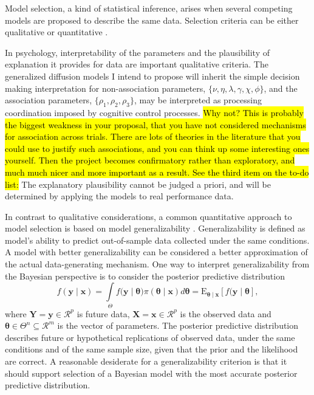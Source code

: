 \documentclass[12pt]{article}
\newcommand{\trish}[1]{\textrm{\hl{#1}}}
\begin{document}
Model selection, a kind of statistical inference, arises when several
competing models are proposed to describe the same data.
Selection criteria can be either qualitative or
quantitative \citep{MyuKar2008,ShiLee2008,VanMat2014}. 

In psychology, interpretability of the parameters and the
plausibility of explanation it provides for data are important
qualitative criteria. The generalized diffusion models I intend to
propose will inherit the simple decision making interpretation for
non-association parameters, $\{\nu, \eta, \lambda, \gamma, \chi, \phi\}$, and the association
parameters, $\{\rho_1, \rho_2, \rho_3\}$, may be interpreted as processing coordination imposed by
cognitive control processes. \trish{Why not?  This is probably the
biggest weakness in your proposal, that you have not considered
mechanisms for association across trials.  There are lots of theories
in the literature that you could use to justify such associations, and
you can think up some interesting ones yourself.  Then the project
becomes confirmatory rather than exploratory, and much much nicer and
more important as a result.  See the third item on the to-do list:} The
explanatory plausibility cannot be judged a priori, and will be
determined by applying the models to real performance data.
    
In contrast to qualitative considerations, a common quantitative
approach to model selection is based on model generalizability
\citep{GelHwa2013}. Generalizability is defined as model's
ability to predict out-of-sample data collected under the same
conditions. A model with better generalizability can be
considered a better approximation of the actual
data-generating mechanism. One way to interpret generalizability
from the Bayesian perspective is to consider the posterior predictive
distribution
%
\begin{equation}
f(\boldsymbol{y} \mid \boldsymbol{x}) = \int\limits_{\Theta} f(\boldsymbol{y} \mid \boldsymbol{\theta)}\pi(\boldsymbol{\theta} \mid \boldsymbol{x})d\boldsymbol{\theta} = \operatorname{E_{\boldsymbol{\theta} \mid \boldsymbol{x}}}[f(\boldsymbol{y} \mid \boldsymbol{\theta}],
\end{equation}
%
where $\boldsymbol{Y} = \boldsymbol{y} \in \mathcal{R}^p$ is future data,
$\boldsymbol{X} = \boldsymbol{x} \in \mathcal{R}^p$ is the observed data and
$\boldsymbol{\theta} \in \Theta^n \subseteq \mathcal{R}^m$ is
the vector of parameters. The posterior predictive
distribution describes future or hypothetical replications of observed data, under the same conditions and of the same sample size, given that the prior and the likelihood are correct. A reasonable desiderate for a generalizability
criterion is that it should support selection of a Bayesian model with the most accurate posterior predictive distribution.
\end{document}
